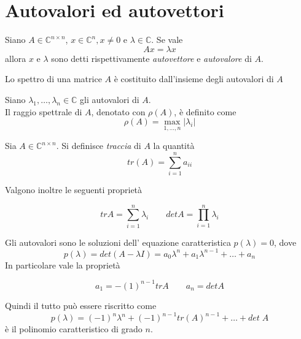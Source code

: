 \section{Autovalori ed autovettori}
\begin{defn}
\label{def:autovalore}
Siano $A \in \mathbb{C}^{n\times n}$, $x \in \mathbb{C}^{n}, x \neq 0$
e $\lambda \in \mathbb{C}$. Se vale 
$$ Ax = \lambda x $$ 
allora $x$ e $\lambda$ sono detti rispettivamente \emph{autovettore} e
\emph{autovalore} di $A$.
\end{defn}

\begin{defn}[Spettro di A]
Lo spettro di una matrice $A$ \`e costituito dall'insieme
degli autovalori di $A$
\end{defn}

\begin{defn}
Siano $\lambda_1, \ldots, \lambda_n \in \mathbb{C}$ gli autovalori di $A$. \\
Il raggio spettrale di $A$, denotato con $\rho(A)$, \`e 
definito come
$$ \rho(A) = \max_{1, \ldots, n} | \lambda_i| $$ 
\end{defn}

\begin{defn}[Traccia di A]
Sia $A \in \mathbb{C}^{n\times n}$.
Si definisce \emph{traccia} di $A$ la quantit\`a
$$ tr(A) = \displaystyle \sum_{i=1}^{n} a_{ii}$$
\end{defn}

Valgono inoltre le seguenti propriet\`a
\begin{property}
$$ \displaystyle trA = \sum_{i=1}^{n} \lambda_i
\qquad
\displaystyle detA = \prod_{i=1}^{n} \lambda_i$$
\end{property}

Gli autovalori sono le soluzioni dell'
equazione caratteristica $p(\lambda) = 0$,
dove 
\begin{equation}
\label{eigenvalues:eq001}  p(\lambda) = det(A - \lambda I) =
 a_0 \lambda^{n} + a_1 \lambda^{n-1} +  \ldots + a_n 
\end{equation}
In particolare  vale la propriet\`a
\begin{property}
$$ a_1 = -(1)^{n-1}trA \qquad a_n= detA$$
\end{property}
Quindi il tutto può essere riscritto come
$$ p(\lambda)  =  (-1)^n\lambda^{n} + (-1)^{n-1}tr(A)^{n-1}+\ldots+det\; A $$
\`e il polinomio caratteristico di grado $n$. \\

